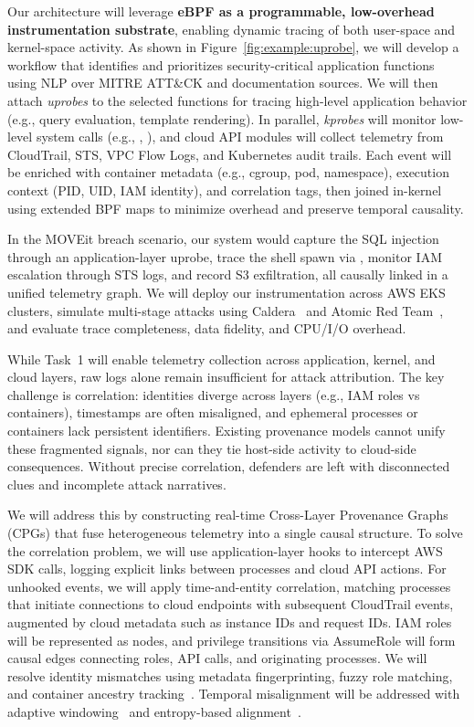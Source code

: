 Our architecture will leverage \textbf{eBPF as a programmable, low-overhead instrumentation substrate}, enabling dynamic tracing of both user-space and kernel-space activity. As shown in Figure~\ref{fig:example:uprobe}, we will develop a workflow that identifies and prioritizes security-critical application functions using NLP over MITRE ATT\&CK and documentation sources. We will then attach \textit{uprobes} to the selected functions for tracing high-level application behavior (e.g., query evaluation, template rendering). In parallel, \textit{kprobes} will monitor low-level system calls (e.g., , ), and cloud API modules will collect telemetry from CloudTrail, STS, VPC Flow Logs, and Kubernetes audit trails. Each event will be enriched with container metadata (e.g., cgroup, pod, namespace), execution context (PID, UID, IAM identity), and correlation tags, then joined in-kernel using extended BPF maps to minimize overhead and preserve temporal causality.

In the MOVEit breach scenario, our system would capture the SQL injection through an application-layer uprobe, trace the shell spawn via , monitor IAM escalation through STS logs, and record S3 exfiltration, all causally linked in a unified telemetry graph. We will deploy our instrumentation across AWS EKS clusters, simulate multi-stage attacks using Caldera~\cite{caldera} and Atomic Red Team~\cite{atomicredteam}, and evaluate trace completeness, data fidelity, and CPU/I/O overhead.




 While Task~1 will enable telemetry collection across application, kernel, and cloud layers, raw logs alone remain insufficient for attack attribution. The key challenge is correlation: identities diverge across layers (e.g., IAM roles vs containers), timestamps are often misaligned, and ephemeral processes or containers lack persistent identifiers. Existing provenance models cannot unify these fragmented signals, nor can they tie host-side activity to cloud-side consequences. Without precise correlation, defenders are left with disconnected clues and incomplete attack narratives.

We will address this by constructing real-time Cross-Layer Provenance Graphs (CPGs) that fuse heterogeneous telemetry into a single causal structure. To solve the correlation problem, we will use application-layer hooks to intercept AWS SDK calls, logging explicit links between processes and cloud API actions. For unhooked events, we will apply time-and-entity correlation, matching processes that initiate connections to cloud endpoints with subsequent CloudTrail events, augmented by cloud metadata such as instance IDs and request IDs. IAM roles will be represented as nodes, and privilege transitions via AssumeRole will form causal edges connecting roles, API calls, and originating processes. We will resolve identity mismatches using metadata fingerprinting, fuzzy role matching, and container ancestry tracking~\cite{huo2023semparser,le2023log,nawaz2021fuzzy}. Temporal misalignment will be addressed with adaptive windowing~\cite{bifet2007learning} and entropy-based alignment~\cite{makanju2010evaluation}.

